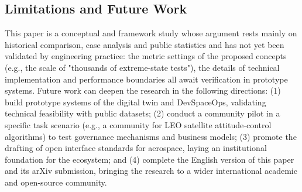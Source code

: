 \documentclass[11pt]{article}
\begin{document}
\subsection{Limitations and Future Work}
This paper is a conceptual and framework study whose argument rests mainly on historical comparison, case analysis and public statistics and has not yet been validated by engineering practice: the metric settings of the proposed concepts (e.g., the scale of "thousands of extreme-state tests"), the details of technical implementation and performance boundaries all await verification in prototype systems. Future work can deepen the research in the following directions: (1) build prototype systems of the digital twin and DevSpaceOps, validating technical feasibility with public datasets; (2) conduct a community pilot in a specific task scenario (e.g., a community for LEO satellite attitude-control algorithms) to test governance mechanisms and business models; (3) promote the drafting of open interface standards for aerospace, laying an institutional foundation for the ecosystem; and (4) complete the English version of this paper and its arXiv submission, bringing the research to a wider international academic and open-source community.
\end{document}
